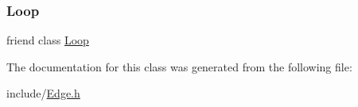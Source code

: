 \mbox{\label{classcfglib_1_1Edge_a6f7095d721dd1dbd490d97c028eb676f}} 
\subsubsection{\texorpdfstring{Loop}{Loop}}
{\footnotesize\ttfamily friend class \hyperlink{classcfglib_1_1Loop}{Loop}\hspace{0.3cm}{\ttfamily [friend]}}



The documentation for this class was generated from the following file\+:\begin{DoxyCompactItemize}
\item 
include/\hyperlink{Edge_8h}{Edge.\+h}\end{DoxyCompactItemize}
